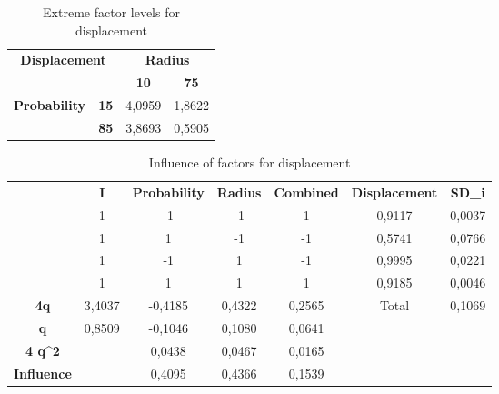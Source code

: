 \begin{table}[H]
\centering
\begin{tabular}{|cc|cc|}
\hline
\multicolumn{2}{|c|}{\multirow{2}{*}{\textbf{Displacement}}} & \multicolumn{2}{c|}{\textbf{Radius}} \\ \cline{3-4} 
\multicolumn{2}{|c|}{} & \multicolumn{1}{c|}{\textbf{10}} & \textbf{75} \\ \hline
\multicolumn{1}{|c|}{\multirow{2}{*}{\textbf{Probability}}} & \textbf{15} & \multicolumn{1}{c|}{4,0959} & 1,8622 \\ \cline{2-4} 
\multicolumn{1}{|c|}{} & \textbf{85} & \multicolumn{1}{c|}{3,8693} & 0,5905 \\ \hline
\end{tabular}
\caption{Extreme factor levels for displacement}
\end{table}

\begin{table}[H]\label{tab:InflDisp}
\centering
\begin{tabular}{c|c|c|c|c|cc}
\cline{2-7}
 & \textbf{I} & \textbf{Probability} & \textbf{Radius} & \textbf{Combined} & \multicolumn{1}{c|}{\textbf{Displacement}} & \multicolumn{1}{c|}{\textbf{SD\_i}} \\ \cline{2-7} 
 & 1 & -1 & -1 & 1 & \multicolumn{1}{c|}{0,9117} & \multicolumn{1}{c|}{0,0037} \\ \cline{2-7} 
 & 1 & 1 & -1 & -1 & \multicolumn{1}{c|}{0,5741} & \multicolumn{1}{c|}{0,0766} \\ \cline{2-7} 
 & 1 & -1 & 1 & -1 & \multicolumn{1}{c|}{0,9995} & \multicolumn{1}{c|}{0,0221} \\ \cline{2-7} 
 & 1 & 1 & 1 & 1 & \multicolumn{1}{c|}{0,9185} & \multicolumn{1}{c|}{0,0046} \\ \hline
\multicolumn{1}{|c|}{\textbf{4q}} & 3,4037 & -0,4185 & 0,4322 & 0,2565 & \multicolumn{1}{c|}{Total} & \multicolumn{1}{c|}{0,1069} \\ \hline
\multicolumn{1}{|c|}{\textbf{q}} & 0,8509 & -0,1046 & 0,1080 & 0,0641 &  &  \\ \cline{1-5}
\multicolumn{1}{|c|}{\textbf{4 q\textasciicircum{}2}} &  & 0,0438 & 0,0467 & 0,0165 &  &  \\ \cline{1-5}
\multicolumn{1}{|c|}{\textbf{Influence}} &  & 0,4095 & 0,4366 & 0,1539 &  &  \\ \cline{1-5}
\end{tabular}
\caption{Influence of factors for displacement}
\end{table}


